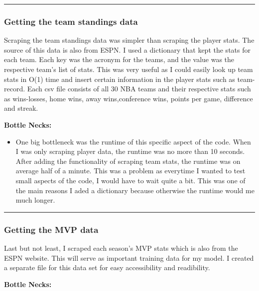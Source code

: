 \documentclass[11pt]{article}
\providecommand{\tightlist}{%
      \setlength{\itemsep}{0pt}\setlength{\parskip}{0pt}}
\begin{document}
\begin{center}\rule{0.5\linewidth}{\linethickness}\end{center}

    \subsubsection{Getting the team standings
data}\label{getting-the-team-standings-data}

Scraping the team standings data was simpler than scraping the player
stats. The source of this data is also from ESPN. I used a dictionary
that kept the stats for each team. Each key was the acronym for the
teams, and the value was the respective team's list of stats. This was
very useful as I could easily look up team stats in O(1) time and insert
certain information in the player stats such as team-record. Each csv
file consists of all 30 NBA teams and their respective stats such as
wins-losses, home wins, away wins,conference wins, points per game,
difference and streak.

\textbf{Bottle Necks:}

\begin{itemize}
\tightlist
\item
  One big bottleneck was the runtime of this specific aspect of the
  code. When I was only scraping player data, the runtime was no more
  than 10 seconds. After adding the functionality of scraping team
  stats, the runtime was on average half of a minute. This was a problem
  as everytime I wanted to test small aspects of the code, I would have
  to wait quite a bit. This was one of the main reasons I aded a
  dictionary because otherwise the runtime would me much longer.
\end{itemize}

\begin{center}\rule{0.5\linewidth}{\linethickness}\end{center}

    \subsubsection{Getting the MVP data}\label{getting-the-mvp-data}

Last but not least, I scraped each season's MVP stats which is also from
the ESPN website. This will serve as important training data for my
model. I created a separate file for this data set for easy
accessibility and readibility.

\textbf{Bottle Necks:}
\end{document}
